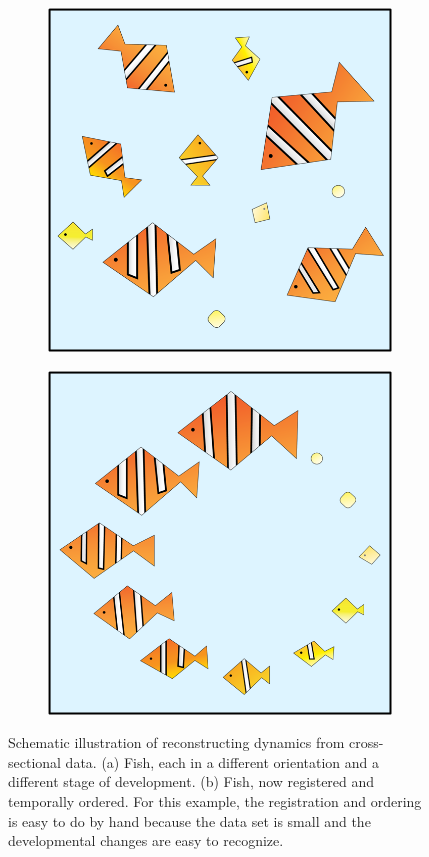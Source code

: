 \documentclass{pnastwo}
\begin{document}
\begin{figure}
\begin{subfigure}{0.25\textwidth}
\includegraphics[width=\textwidth]{fish1}
\caption{}
\end{subfigure}
\begin{subfigure}{0.25\textwidth}
\includegraphics[width=\textwidth]{fish2}
\caption{}
\end{subfigure}
\caption{Schematic illustration of reconstructing dynamics from cross-sectional data. (a) Fish, each in a different orientation and a different stage of development. (b) Fish, now registered and temporally ordered. For this example, the registration and ordering is easy to do by hand because the data set is small and the developmental changes are easy to recognize.} 
\label{fig:fish}
\end{figure}
\end{document}
